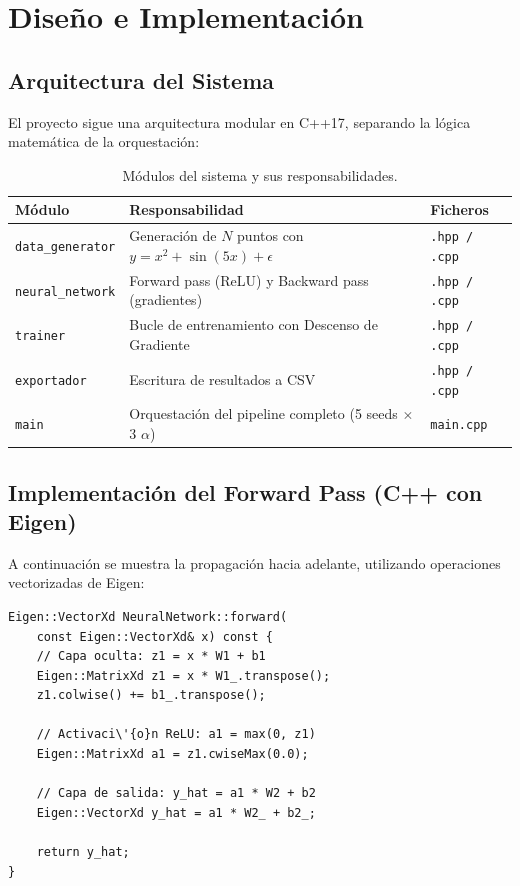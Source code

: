 \documentclass[12pt,a4paper]{article}
\theoremstyle{definition}
\begin{document}
\section{Dise\~{n}o e Implementaci\'{o}n}\label{sec:implementacion}

\subsection{Arquitectura del Sistema}

El proyecto sigue una arquitectura modular en C++17, separando la l\'{o}gica matem\'{a}tica de la orquestaci\'{o}n:

\begin{table}[H]
\centering
\caption{M\'{o}dulos del sistema y sus responsabilidades.}
\label{tab:modulos}
\begin{tabular}{@{}lp{7cm}l@{}}
\toprule
\textbf{M\'{o}dulo} & \textbf{Responsabilidad} & \textbf{Ficheros} \\ \midrule
\texttt{data\_generator} & Generaci\'{o}n de $N$ puntos con $y = x^2 + \sin(5x) + \epsilon$ & \texttt{.hpp / .cpp} \\
\texttt{neural\_network} & Forward pass (ReLU) y Backward pass (gradientes) & \texttt{.hpp / .cpp} \\
\texttt{trainer} & Bucle de entrenamiento con Descenso de Gradiente & \texttt{.hpp / .cpp} \\
\texttt{exportador} & Escritura de resultados a CSV & \texttt{.hpp / .cpp} \\
\texttt{main} & Orquestaci\'{o}n del pipeline completo (5 seeds $\times$ 3 $\alpha$) & \texttt{main.cpp} \\
\bottomrule
\end{tabular}
\end{table}

\subsection{Implementaci\'{o}n del Forward Pass (C++ con Eigen)}

A continuaci\'{o}n se muestra la propagaci\'{o}n hacia adelante, utilizando operaciones vectorizadas de Eigen:

\begin{lstlisting}[caption={Forward Pass con activaci\'{o}n ReLU.}]
Eigen::VectorXd NeuralNetwork::forward(
    const Eigen::VectorXd& x) const {
    // Capa oculta: z1 = x * W1 + b1
    Eigen::MatrixXd z1 = x * W1_.transpose();
    z1.colwise() += b1_.transpose();
    
    // Activaci\'{o}n ReLU: a1 = max(0, z1)
    Eigen::MatrixXd a1 = z1.cwiseMax(0.0);
    
    // Capa de salida: y_hat = a1 * W2 + b2
    Eigen::VectorXd y_hat = a1 * W2_ + b2_;
    
    return y_hat;
}
\end{lstlisting}
\end{document}
